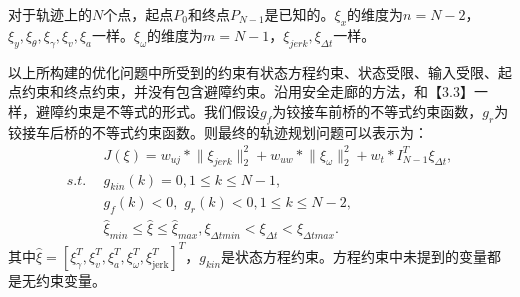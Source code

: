 \documentclass[master,academic]{ysuthesis} %
\begin{document}
		对于轨迹上的$N$个点，起点$P_0$和终点$P_{N-1}$是已知的。$\xi _{x}$的维度为$n=N-2$，$\xi _{y},\xi _{\theta},\xi _{\gamma},\xi _{v},\xi _{a}$一样。$\xi _{\omega}$的维度为$m=N-1$，$\xi_{jerk},\xi _{\Delta t}$一样。

		以上所构建的优化问题中所受到的约束有状态方程约束、状态受限、输入受限、起点约束和终点约束，并没有包含避障约束。沿用安全走廊的方法，和【3.3】一样，避障约束是不等式的形式。我们假设$g_f$为铰接车前桥的不等式约束函数，$g_r$为铰接车后桥的不等式约束函数。则最终的轨迹规划问题可以表示为：
		\begin{equation}
			\begin{aligned}
			&J\left( \xi \right) =w_{uj}*\lVert \xi _{jerk} \rVert _{2}^{2}+w_{uw}*\lVert \xi _{\omega} \rVert _{2}^{2}+w_t*I_{N-1}^{T}\xi _{\Delta t},\\
			s.t.\ \ &g_{kin}\left( k \right) =0,1\leq k\leq N-1,\\
			&g_f\left( k \right) <0,\,\,g_r\left( k \right) <0,1\leq k\leq N-2,\\
			&\hat{\xi}_{min}\le \hat{\xi}\le \hat{\xi}_{max},\xi _{\Delta tmin}<\xi _{\Delta t}<\xi _{\Delta tmax}.
			\end{aligned}   
		\end{equation}
		其中$\hat{\xi}=\left[ \xi _{\gamma}^{T},\xi _{v}^{T},\xi _{a}^{T},\xi _{\omega}^{T},\xi _{\text{jerk}}^{T} \right] ^T$，$g_{kin}$是状态方程约束。方程约束中未提到的变量都是无约束变量。
\end{document}
